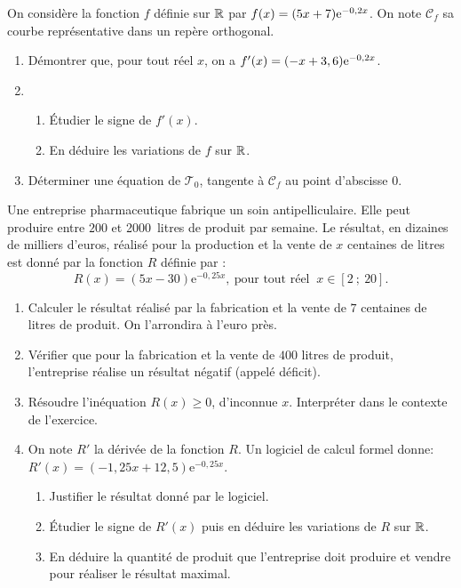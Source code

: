 \documentclass[a4paper,11pt]{article}
\begin{document}
\medskip


\medskip

On considère la fonction $f$ définie sur $\R$ par $f(x)=(5x+7){\rm e}^{-0,2x}$. On note $\mathscr{C}_f$ sa courbe représentative dans un repère orthogonal.
%
\begin{enumerate}
	\item Démontrer que, pour tout réel $x$, on a $f'(x)=(-x+3,6){\rm e}^{-0,2x}$.
	\item 
	\begin{enumerate}
		\item \'{E}tudier le signe de $f'(x)$.
		\item En déduire les variations de $f$ sur $\R$.
	\end{enumerate}
	\item Déterminer une équation de $\mathscr{T}_0$, tangente à $\mathscr{C}_f$ au point d'abscisse $0$.
\end{enumerate}

\medskip


\medskip

Une entreprise pharmaceutique fabrique un soin antipelliculaire. Elle peut produire entre $200$ et \num{2000}~litres de produit par semaine. Le résultat, en dizaines de milliers d'euros, réalisé pour la production et la vente de $x$ centaines de litres est donné par la fonction $R$ définie par : \[R(x) = (5x - 30)\text{e}^{-0,25x},\:  \text{pour tout réel }\: x \in  [2~;~20].\]

\begin{enumerate}
	\item Calculer le résultat réalisé par la fabrication et la vente de $7$ centaines de litres de produit. On l'arrondira à l'euro près.
	\item Vérifier que pour la fabrication et la vente de $400$ litres de produit, l'entreprise réalise un résultat négatif (appelé déficit).
	\item Résoudre l'inéquation $R(x) \geqslant 0$, d'inconnue $x$. Interpréter dans le contexte de l'exercice.
	\item On note $R'$ la dérivée de la fonction $R$. Un logiciel de calcul formel donne: $R'(x) = (- 1,25x + 12,5)\text{e}^{-0,25x}$.
	\begin{enumerate}
		\item Justifier le résultat donné par le logiciel.
		\item \'{E}tudier le signe de $R'(x)$ puis en déduire les variations de $R$ sur $\R$.
		\item En déduire la quantité de produit que l'entreprise doit produire et vendre pour réaliser le résultat maximal.
	\end{enumerate}
\end{enumerate}
\end{document}
